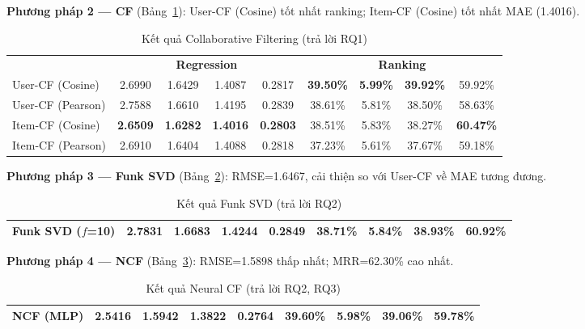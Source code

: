\documentclass[11pt]{article}
\begin{document}
\textbf{Phương pháp 2 --- CF} (Bảng~\ref{tab:cf}): User-CF (Cosine) tốt nhất ranking; Item-CF (Cosine) tốt nhất MAE (1.4016).

\begin{table}[t]
\centering
\caption{Kết quả Collaborative Filtering (trả lời RQ1)}
\label{tab:cf}
\begin{tabular}{lcccc|cccc}
\toprule
& \multicolumn{4}{c|}{\textbf{Regression}} & \multicolumn{4}{c}{\textbf{Ranking}} \\User-CF (Cosine) & 2.6990 & 1.6429 & 1.4087 & 0.2817 & \textbf{39.50\%} & \textbf{5.99\%} & \textbf{39.92\%} & 59.92\% \\User-CF (Pearson) & 2.7588 & 1.6610 & 1.4195 & 0.2839 & 38.61\% & 5.81\% & 38.50\% & 58.63\% \\Item-CF (Cosine) & \textbf{2.6509} & \textbf{1.6282} & \textbf{1.4016} & \textbf{0.2803} & 38.51\% & 5.83\% & 38.27\% & \textbf{60.47\%} \\Item-CF (Pearson) & 2.6910 & 1.6404 & 1.4088 & 0.2818 & 37.23\% & 5.61\% & 37.67\% & 59.18\% \\\bottomrule
\end{tabular}
\end{table}

\textbf{Phương pháp 3 --- Funk SVD} (Bảng~\ref{tab:svd}): RMSE=1.6467, cải thiện so với User-CF về MAE tương đương.

\begin{table}[t]
\centering
\caption{Kết quả Funk SVD (trả lời RQ2)}
\label{tab:svd}
\begin{tabular}{lcccc|cccc}
\toprule
Funk SVD ($f$=10) & \textbf{2.7831} & \textbf{1.6683} & \textbf{1.4244} & \textbf{0.2849} & \textbf{38.71\%} & \textbf{5.84\%} & \textbf{38.93\%} & \textbf{60.92\%} \\\bottomrule
\end{tabular}
\end{table}

\textbf{Phương pháp 4 --- NCF} (Bảng~\ref{tab:ncf}): RMSE=1.5898 thấp nhất; MRR=62.30\% cao nhất.

\begin{table}[t]
\centering
\caption{Kết quả Neural CF (trả lời RQ2, RQ3)}
\label{tab:ncf}
\begin{tabular}{lcccc|cccc}
\toprule
NCF (MLP) & \textbf{2.5416} & \textbf{1.5942} & \textbf{1.3822} & \textbf{0.2764} & \textbf{39.60\%} & \textbf{5.98\%} & \textbf{39.06\%} & \textbf{59.78\%} \\\bottomrule
\end{tabular}
\end{table}
\end{document}
